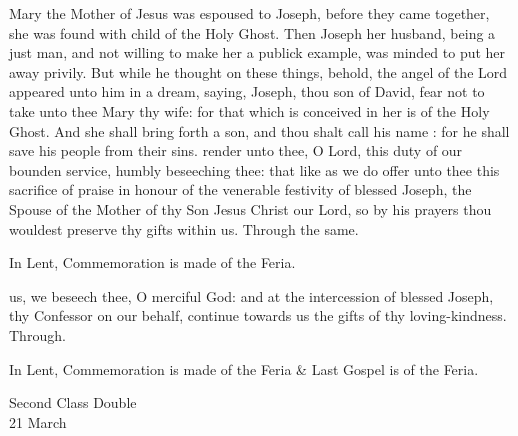  Mary the Mother of Jesus was espoused to Joseph, before they came together, she was found with child of the Holy Ghost. Then Joseph her husband, being a just man, and not willing to make her a publick example, was minded to put her away privily. But while he thought on these things, behold, the angel of the Lord appeared unto him in a dream, saying, Joseph, thou son of David, fear not to take unto thee Mary thy wife: for that which is conceived in her is of the Holy Ghost. And she shall bring forth a son, and thou shalt call his name : for he shall save his people from their sins.
\secret
{} render unto thee, O Lord, this duty of our bounden service, humbly beseeching thee: that like as we do offer unto thee this sacrifice of praise in honour of the venerable festivity of blessed Joseph, the Spouse of the Mother of thy Son Jesus Christ our Lord, so by his prayers thou wouldest preserve thy gifts within us. Through the same.
\begin{rubric}
    In Lent, Commemoration is made of the Feria.
\end{rubric}
\postcommunion
{} us, we beseech thee, O merciful God: and at the intercession of blessed Joseph, thy Confessor on our behalf, continue towards us the gifts of thy loving-kindness. Through.
\begin{rubric}
    In Lent, Commemoration is made of the Feria \& Last Gospel is of the Feria.
\end{rubric}

\clearpage
{}
\begin{inhead}
    {Second Class Double\\
21 March}
\end{inhead}

